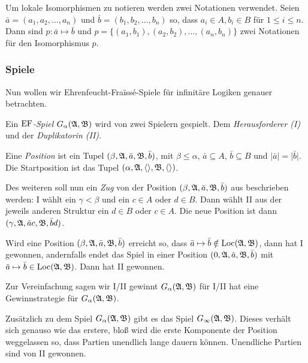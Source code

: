 Um lokale Isomorphismen zu notieren werden zwei Notationen verwendet. Seien $\bar{a}=(a_1,a_2,\dots,a_n)$ und $\bar{b}=(b_1,b_2,\dots,b_n)$ so, dass $a_i\in A,b_i\in B$ für $1\leq i \leq n$.
Dann sind $p:\bar{a}\mapsto\bar{b}$ und $p=\{(a_1,b_1),(a_2,b_2),\dots,(a_n,b_n)\}$ zwei Notationen für den Isomorphismus $p$.


\subsubsection*{Spiele}

Nun wollen wir Ehrenfeucht-Fra\"{i}ss\'{e}-Spiele für infinitäre Logiken genauer betrachten.
\begin{definition}
	Ein \textit{$\operatorname{EF}$-Spiel} $G_\alpha(\mathfrak{A},\mathfrak{B})$ wird von zwei Spielern gespielt. Dem \textit{Herausforderer (I)} und der \textit{Duplikatorin (II)}. 
	
	Eine \textit{Position} ist ein Tupel $(\beta,\mathfrak{A},\bar{a},\mathfrak{B},\bar{b})$, mit $\beta\leq \alpha$, $\bar{a}\subseteq A$, $\bar{b}\subseteq B$ und $\vert\bar{a}\vert = \vert\bar{b}\vert$.
	Die Startposition ist das Tupel $(\alpha, \mathfrak{A},\langle\rangle,\mathfrak{B},\langle\rangle)$.
	
	Des weiteren soll nun ein \textit{Zug} von der Position $(\beta,\mathfrak{A},\bar{a},\mathfrak{B},\bar{b})$ aus beschrieben werden: I wählt ein $\gamma < \beta$ und ein $c\in A$ oder $d\in B$. Dann wählt II aus der jeweils anderen Struktur ein $d\in B$ oder $c\in A$. Die neue Position ist dann $(\gamma,\mathfrak{A},\bar{a}c,\mathfrak{B},\bar{b}d)$.
	
	Wird eine Position $(\beta,\mathfrak{A},\bar{a},\mathfrak{B},\bar{b})$ erreicht so, dass $\bar{a}\mapsto\bar{b}\notin \operatorname{Loc}(\mathfrak{A},\mathfrak{B})$, dann hat I gewonnen, andernfalls endet das Spiel in einer Position $(0,\mathfrak{A},\bar{a},\mathfrak{B},\bar{b})$ mit $\bar{a}\mapsto\bar{b}\in \operatorname{Loc}(\mathfrak{A},\mathfrak{B})$. Dann hat II gewonnen.
\end{definition}

Zur Vereinfachung sagen wir \glqq I/II gewinnt $G_\alpha(\mathfrak{A},\mathfrak{B})$\grqq{} für \glqq I/II hat eine Gewinnstrategie für $G_\alpha(\mathfrak{A},\mathfrak{B})$\grqq{}.

\begin{definition}
	Zusätzlich zu dem Spiel $G_\alpha(\mathfrak{A},\mathfrak{B})$ gibt es das Spiel $G_\infty(\mathfrak{A},\mathfrak{B})$. 
	Dieses verhält sich genauso wie das erstere, bloß wird die erste Komponente der Position weggelassen so, dass Partien unendlich lange dauern können.
	Unendliche Partien sind von II gewonnen.
\end{definition}

